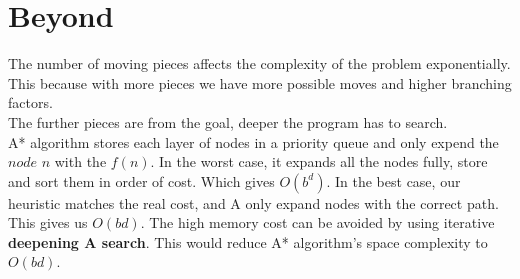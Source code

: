 \documentclass[11pt,a4paper]{article}
\begin{document}
    \section{Beyond}
        The number of moving pieces affects the complexity of the problem exponentially. This because with more pieces we have more possible moves and higher branching factors.\\
        The further pieces are from the goal, deeper the program has to search.\\
        A* algorithm stores each layer of nodes in a priority queue and only expend the $node$ $n$ with the $f(n)$. In the worst case, it expands all the nodes fully, store and sort them in order of cost. Which gives $O(b^d)$. In the best case, our heuristic matches the real cost, and A only expand nodes with the correct path. This gives us $O(bd)$. The high memory cost can be avoided by using iterative \textbf{deepening A search}. This would reduce A* algorithm's space complexity to $O(bd)$.
        
\end{document}
